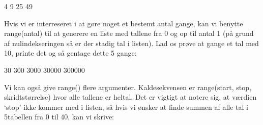 \documentclass[letterpaper,10pt,english]{jupyterBook}
\begin{document}
\begin{sphinxVerbatim}[commandchars=\\\{\}]
  \PYG{p}{[}   \PYG{p}{]}

        
       
\end{sphinxVerbatim}

\begin{sphinxVerbatim}[commandchars=\\\{\}]
4
9
25
49
\end{sphinxVerbatim}

Hvis vi er interreseret i at gøre noget et bestemt antal gange, kan vi benytte range(antal) til at generere en liste med tallene fra 0 og op til antal \sphinxhyphen{} 1 (på grund af nulindekseringen så er der stadig  tal i listen). Lad os prøve at gange et tal med 10, printe det og så gentage dette 5 gange:

\begin{sphinxVerbatim}[commandchars=\\\{\}]
  
    
       
\end{sphinxVerbatim}

\begin{sphinxVerbatim}[commandchars=\\\{\}]
30
300
3000
30000
300000
\end{sphinxVerbatim}

Vi kan også give range() flere argumenter. Kaldesekvensen er range(start, stop, skridtstørrelse) hvor alle tallene er heltal. Det er vigtigt at notere sig, at værdien ‘stop’ ikke kommer med i listen, så hvis vi ønsker at finde summen af alle tal i 5\sphinxhyphen{}tabellen fra 0 til 40, kan vi skrive:
\end{document}
